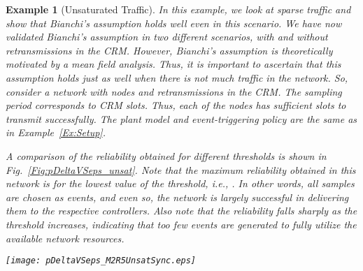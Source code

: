 \documentclass[journal]{IEEEtran}
\newtheorem{example}{Example}[section]
\begin{document}
\begin{example}[Unsaturated Traffic] \label{Ex:Unsat}
In this example, we look at sparse traffic and show that Bianchi's assumption holds well even in this scenario. We have now validated Bianchi's assumption in two different scenarios, with and without retransmissions in the CRM. However, Bianchi's assumption is theoretically motivated by a mean field analysis. Thus, it is important to ascertain that this assumption holds just as well when there is not much traffic in the network. So, consider a network with  nodes and  retransmissions in the CRM. The sampling period corresponds to  CRM slots. Thus, each of the nodes has sufficient slots to transmit successfully. The plant model and event-triggering policy are the same as in Example~\ref{Ex:Setup}.

A comparison of the reliability obtained for different thresholds is shown in Fig.~\ref{Fig:pDeltaVSeps_unsat}. Note that the maximum reliability obtained in this network is for the lowest value of the threshold, i.e., . In other words, all samples are chosen as events, and even so, the network is largely successful in delivering them to the respective controllers. Also note that the reliability falls sharply as the threshold increases, indicating that too few events are generated to fully utilize the available network resources.

\begin{figure*}[tb]
\begin{center}
\texttt{[image: pDeltaVSeps\_M2R5UnsatSync.eps]}
\caption{A comparison of the analytical and simulated values of the reliability versus the scheduler threshold, with unsaturated traffic. There are just  nodes in the network and the CRM permits  retransmissions. Even so, Bianchi's assumption seems to hold, indicating that this is a good approximation of unsaturated and saturated network conditions.} \label{Fig:pDeltaVSeps_unsat}
\end{center}
\end{figure*}
\end{example}
\end{document}
